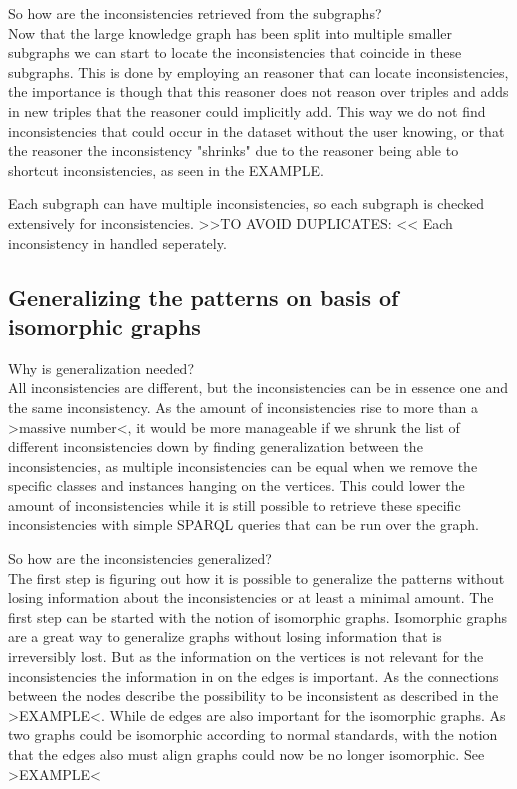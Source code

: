 \documentclass{article}
\begin{document}
So how are the inconsistencies retrieved from the subgraphs?\\
Now that the large knowledge graph has been split into multiple smaller subgraphs we can start to locate the inconsistencies that coincide in these subgraphs. This is done by employing an reasoner that can locate inconsistencies, the importance is though that this reasoner does not reason over triples and adds in new triples that the reasoner could implicitly add. This way we do not find inconsistencies that could occur in the dataset without the user knowing, or that the reasoner the inconsistency "shrinks" due to the reasoner being able to shortcut inconsistencies, as seen in the EXAMPLE.

Each subgraph can have multiple inconsistencies, so each subgraph is checked extensively for inconsistencies.  >>TO AVOID DUPLICATES: << Each inconsistency in handled seperately.


\subsection{Generalizing the patterns on basis of isomorphic graphs}
Why is generalization needed?\\
All inconsistencies are different, but the inconsistencies can be in essence one and the same inconsistency. As the amount of inconsistencies rise to more than a >massive number<, it would be more manageable if we shrunk the list of different inconsistencies down by finding generalization between the inconsistencies, as multiple inconsistencies can be equal when we remove the specific classes and instances hanging on the vertices. This could lower the amount of inconsistencies while it is still possible to retrieve these specific inconsistencies with simple SPARQL queries that can be run over the graph. 

So how are the inconsistencies generalized?\\
The first step is figuring out how it is possible to generalize the patterns without losing information about the inconsistencies or at least a minimal amount. The first step can be started with the notion of isomorphic graphs. Isomorphic graphs are a great way to generalize graphs without losing information that is irreversibly lost. But as the information on the vertices is not relevant for the inconsistencies the information in on the edges is important. As the connections between the nodes describe the possibility to be inconsistent as described in the >EXAMPLE<. While de edges are also important for the isomorphic graphs. As two graphs could be isomorphic according to normal standards, with the notion that the edges also must align graphs could now be no longer isomorphic. See >EXAMPLE<
\end{document}
